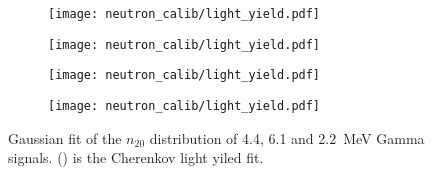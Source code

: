 \begin{figure}[htbp]
	\centering
	\begin{subfigure}{0.5\textwidth}
		\centering
		\texttt{[image: neutron\_calib/light\_yield.pdf]}
		\caption{}
		\label{fig:fitene4}
	\end{subfigure}%
	\begin{subfigure}{0.5\textwidth}
		\centering
		\texttt{[image: neutron\_calib/light\_yield.pdf]}
		\caption{}
		\label{fig:fitene6}
	\end{subfigure}
	\begin{subfigure}{0.5\textwidth}
		\centering
		\texttt{[image: neutron\_calib/light\_yield.pdf]}
		\caption{}
		\label{fig:fitene2}
	\end{subfigure}%
	\begin{subfigure}{0.5\textwidth}
		\centering
		\texttt{[image: neutron\_calib/light\_yield.pdf]}
		\caption{}
		\label{fig:yield}
	\end{subfigure}
	\caption{Gaussian fit of the $n_{20}$ distribution of 4.4, 6.1 and \SI{2.2}{MeV} Gamma signals. () is the Cherenkov light yiled fit.}
	\label{fig:FitYield}
\end{figure}

